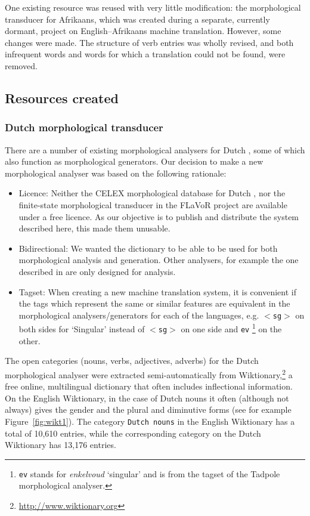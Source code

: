 \documentclass[11pt]{article}
\begin{document}
One existing resource was reused with very little modification: the 
morphological transducer for Afrikaans, which was created during a separate, currently dormant, 
project on English--Afrikaans machine translation. However, some changes were made. The structure 
of verb entries was wholly revised, and both infrequent words and words for which a translation
could not be found, were removed.

\subsection{Resources created}

\subsubsection{Dutch morphological transducer}

There are a number of existing morphological analysers for Dutch \cite{Bosch:07,Laureys:04,DePauw:04},
some of which also function as morphological generators. Our decision to make a new morphological 
analyser was based on the following rationale:

\begin{itemize}
\item Licence: Neither the CELEX morphological database for Dutch \cite{Laureys:04},
    nor the finite-state morphological transducer in the FLaVoR project \cite{DePauw:04}
    are available under a free licence. As our objective is to publish and distribute 
    the system described here, this made them unusable.
\item Bidirectional: We wanted the dictionary to be able to be used for both
    morphological analysis and generation. Other analysers, for example the 
    one described in  are only designed for analysis.
\item Tagset: When creating a new machine translation system, it is convenient
    if the tags which represent the same or similar features are equivalent in the 
    morphological analysers/generators for each of the languages,
    e.g. {\small {\tt $<$sg$>$}} on both sides for `Singular' instead 
    of {\small {\tt $<$sg$>$}} on one side and {\small {\tt ev}} 
    \footnote{{\tt ev} stands for \emph{enkelvoud} `singular' and is from the tagset of the Tadpole morphological analyser.} on the other.
\end{itemize}

The open categories (nouns, verbs, adjectives, adverbs) for the Dutch 
morphological analyser were extracted semi-automatically from 
Wiktionary,\footnote{\url{http://www.wiktionary.org}} a free online, multilingual
dictionary that often includes inflectional information. On the English Wiktionary, in the case 
of Dutch nouns it often (although not always) gives the gender and the 
plural and diminutive forms (see for example Figure~\ref{fig:wikt1}).
The category {\small {\tt Dutch nouns}} in the English Wiktionary has a total of 10,610 entries,
while the corresponding category on the Dutch Wiktionary has 13,176 entries.
\end{document}
